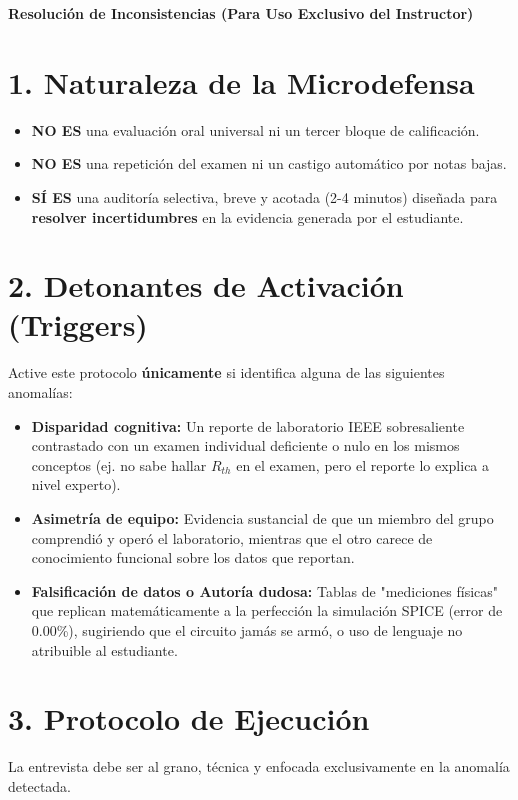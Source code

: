 \documentclass[11pt, a4paper]{article}
\begin{document}
\begin{tcolorbox}[colback=ucbblue!5!white, colframe=ucbblue, title=\textbf{Protocolo de Activación Condicional: Microdefensa Oral}]
    \centering \textbf{Resolución de Inconsistencias (Para Uso Exclusivo del Instructor)}
\end{tcolorbox}

\section*{1. Naturaleza de la Microdefensa}
\begin{itemize}
    \item \textbf{NO ES} una evaluación oral universal ni un tercer bloque de calificación.
    \item \textbf{NO ES} una repetición del examen ni un castigo automático por notas bajas.
    \item \textbf{SÍ ES} una auditoría selectiva, breve y acotada (2-4 minutos) diseñada para \textbf{resolver incertidumbres} en la evidencia generada por el estudiante.
\end{itemize}

\section*{2. Detonantes de Activación (Triggers)}
Active este protocolo \textbf{únicamente} si identifica alguna de las siguientes anomalías:
\begin{itemize}
    \item \textbf{Disparidad cognitiva:} Un reporte de laboratorio IEEE sobresaliente contrastado con un examen individual deficiente o nulo en los mismos conceptos (ej. no sabe hallar $R_{th}$ en el examen, pero el reporte lo explica a nivel experto).
    \item \textbf{Asimetría de equipo:} Evidencia sustancial de que un miembro del grupo comprendió y operó el laboratorio, mientras que el otro carece de conocimiento funcional sobre los datos que reportan.
    \item \textbf{Falsificación de datos o Autoría dudosa:} Tablas de "mediciones físicas" que replican matemáticamente a la perfección la simulación SPICE (error de 0.00\%), sugiriendo que el circuito jamás se armó, o uso de lenguaje no atribuible al estudiante.
\end{itemize}

\section*{3. Protocolo de Ejecución}
La entrevista debe ser al grano, técnica y enfocada exclusivamente en la anomalía detectada.
\end{document}

